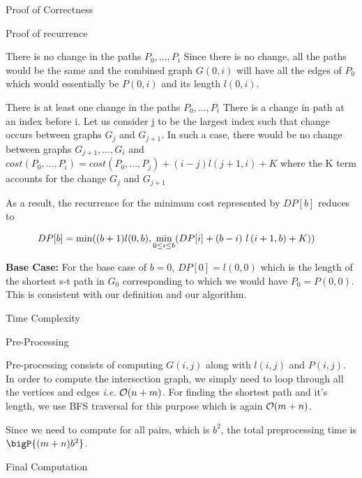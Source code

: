 \documentclass{article}
\begin{document}
\begin{question}
\begin{qsection}{Proof of Correctness}
\begin{qsubsection}{Proof of recurrence}
\begin{qcase}{1}{There is no change in the paths $P_0, \dots, P_i$}
				Since there is no change, all the paths would be the same and the combined graph $G(0,i)$ will have all the edges of $P_0$ which would essentially be $P(0,i)$ and its length $l(0,i)$.
			\end{qcase}

			\begin{qcase}{2}{There is at least one change in the paths $P_0, \dots, P_i$}
				There is a change in path at an index before i. Let us consider j to be the largest index such that change occurs between graphs $G_j$ and $G_{j+1}$. In such a case, there would be no change between graphs $G_{j+1}, \dots, G_i$ and $cost(P_0, \dots , P_i)= cost(P_0, \dots , P_j) + (i-j)l(j+1,i) + K$ where the K term accounts for the change $G_j$ and $G_{j+1}$
			\end{qcase}

			As a result, the recurrence for the minimum cost represented by $DP[b]$ reduces to 

			\begin{align*}
				DP[b] &= \min((b+1)l(0,b), \min_{0 \leq i \leq b}(DP[i] + (b-i) \, \func{l}{i + 1, b} + K))
			\end{align*}

			\textbf{Base Case:} For the base case of $b=0$, $DP[0] = l(0, 0)$ which is the length of the shortest s-t path in $G_0$ corresponding to which we would have $P_0 = P(0, 0)$. This is consistent with our definition and our algorithm.
		\end{qsubsection}

	\end{qsection}

	\clearpage

	\begin{qsection}{Time Complexity}

		\begin{qsubsection}{Pre-Processing}

			Pre-processing consists of computing $G(i,j)$ along with $l(i,j)$ and $P(i,j)$. In order to compute the intersection graph, we simply need to loop through all the vertices and edges \textit{i.e.} $\mathcal{O}(n + m)$. For finding the shortest path and it's length, we use BFS traversal for this purpose which is again $\mathcal{O}(m + n)$.

			Since we need to compute for all pairs, which is $b^2$, the total preprocessing time is $\bigP{(m + n)b^2}$.

		\end{qsubsection}

		\begin{qsubsection}{Final Computation}
			

\end{qsubsection}
\end{qsection}
\end{question}
\end{document}
